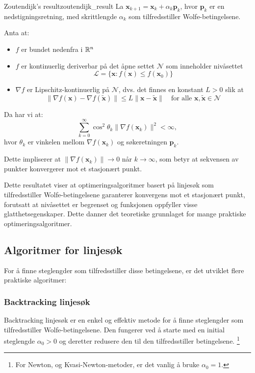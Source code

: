 \begin{theorem}{Zoutendijk's result}{zoutendijk_result}
	La \( \symbf{x}_{k+1} = \symbf{x}_k + \alpha_k \symbf{p}_k \), hvor \( \mathbf{p}_k \) er en nedstigningsretning, med skrittlengde \( \alpha_k \) som tilfredsstiller Wolfe-betingelsene.

	Anta at:
	\begin{itemize}
		\item \(f\) er bundet nedenfra i \(\mathbb{R}^n\)
		\item \(f\) er kontinuerlig deriverbar på det åpne settet \(\mathcal{N}\) som inneholder nivåsettet
		      \[ \mathcal{L} = \{\symbf{x}: f(\symbf{x}) \leq f(\symbf{x}_0)\} \]
		\item \(\nabla f\) er Lipschitz-kontinuerlig på \(\mathcal{N}\), dvs. det finnes en konstant \(L > 0\) slik at
		      \[ \|\nabla f(\symbf{x}) - \nabla f(\tilde{\symbf{x}})\| \leq L\|\symbf{x} - \tilde{\symbf{x}}\| \quad \text{for alle } \symbf{x}, \tilde{\symbf{x}} \in \mathcal{N} \]
	\end{itemize}

	Da har vi at:
	\[
		\sum_{k=0}^{\infty} \cos^2 \theta_k \| \nabla f(\symbf{x}_k) \|^2 < \infty,
	\]
	hvor \( \theta_k \) er vinkelen mellom \( \nabla f(\symbf{x}_k) \) og søkeretningen \( \symbf{p}_k \).

	Dette impliserer at \( \| \nabla f(\symbf{x}_k) \| \to 0 \) når \( k \to \infty \), som betyr at sekvensen av punkter konvergerer mot et stasjonært punkt.
\end{theorem}

Dette resultatet viser at optimeringsalgoritmer basert på linjesøk som tilfredsstiller Wolfe-betingelsene garanterer konvergens mot et stasjonært punkt, forutsatt at nivåsettet er begrenset og funksjonen oppfyller visse glatthetsegenskaper. Dette danner det teoretiske grunnlaget for mange praktiske optimeringsalgoritmer.

\subsection{Algoritmer for linjesøk}
\label{subsec:line_search_algorithms}

For å finne steglengder som tilfredsstiller disse betingelsene, er det utviklet flere praktiske algoritmer:

\subsubsection{Backtracking linjesøk}
\label{subsubsec:backtracking_line_search}
Backtracking linjesøk er en enkel og effektiv metode for å finne steglengder som tilfredsstiller Wolfe-betingelsene.
Den fungerer ved å starte med en initial steglengde \(\alpha_0 > 0\) og deretter redusere den til den tilfredsstiller betingelsene.
\footnote{For Newton, og Kvasi-Newton-metoder, er det vanlig å bruke \(\alpha_0 = 1\).}

